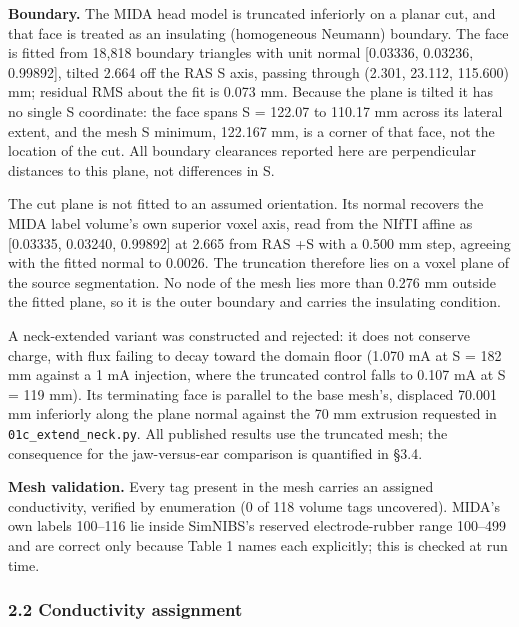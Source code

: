 \documentclass[
  11pt,
  letterpaper,
]{article}
\begin{document}
\textbf{Boundary.} The MIDA head model is truncated inferiorly on a planar cut, and
that face is treated as an insulating (homogeneous Neumann) boundary. The face
is fitted from 18,818 boundary triangles with unit normal {[}\textminus{}0.03336, \textminus{}0.03236,
\textminus{}0.99892{]}, tilted 2.664\textdegree{} off the RAS S axis, passing through (\textminus{}2.301, 23.112,
\textminus{}115.600) mm; residual RMS about the fit is 0.073 mm. Because the plane is
tilted it has no single S coordinate: the face spans S = \textminus{}122.07 to \textminus{}110.17 mm
across its lateral extent, and the mesh S minimum, \textminus{}122.167 mm, is a corner of
that face, not the location of the cut. All boundary clearances reported here
are perpendicular distances to this plane, not differences in S.

The cut plane is not fitted to an assumed orientation. Its normal recovers the
MIDA label volume's own superior voxel axis, read from the NIfTI affine as
{[}0.03335, 0.03240, 0.99892{]} at 2.665\textdegree{} from RAS +S with a 0.500 mm step, agreeing
with the fitted normal to 0.0026\textdegree{}. The truncation therefore lies on a voxel plane
of the source segmentation. No node of the mesh lies more than 0.276 mm outside
the fitted plane, so it is the outer boundary and carries the insulating
condition.

A neck-extended variant was constructed and rejected: it does not conserve
charge, with flux failing to decay toward the domain floor (1.070 mA at S =
\textminus{}182 mm against a 1 mA injection, where the truncated control falls to 0.107 mA
at S = \textminus{}119 mm). Its terminating face is parallel to the base mesh's, displaced
70.001 mm inferiorly along the plane normal against the 70 mm extrusion
requested in \texttt{01c\_extend\_neck.py}. All published results use the truncated mesh;
the consequence for the jaw-versus-ear comparison is quantified in \S{}3.4.

\textbf{Mesh validation.} Every tag present in the mesh carries an assigned
conductivity, verified by enumeration (0 of 118 volume tags uncovered). MIDA's
own labels 100--116 lie inside SimNIBS's reserved electrode-rubber range 100--499
and are correct only because Table 1 names each explicitly; this is checked at
run time.

\subsubsection{2.2 Conductivity assignment}\label{conductivity-assignment}
\end{document}
